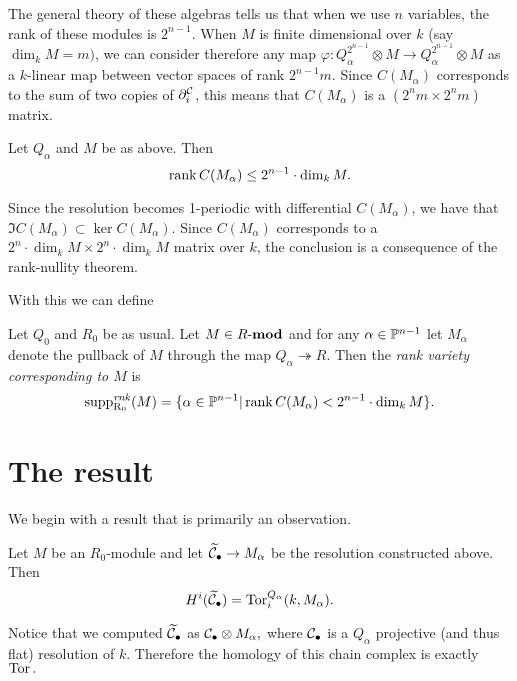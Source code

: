 \documentclass [11pt, proquest] {uwthesis}[2020/02/24]
\DeclareMathOperator{\supprRnaught}{supp^\mathit{rnk}_{R_0}}
\begin{document}
    The general theory of these algebras tells us that when we use $n$ variables, the rank of these modules is $2^{n-1}$. When $M$ is finite dimensional over $k$ (say $\dim_k M=m)$, we can consider therefore any map $\varphi:Q_\alpha^{2^{n-1}}\otimes M\to Q_\alpha^{2^{n-1}}\otimes M$ as a $k$-linear map between vector spaces of rank $2^{n-1}m.$ Since $C(M_\alpha)$ corresponds to the sum of two copies of $\partial^{\mathcal{C}}_i$, this means that $C(M_\alpha)$ is a $(2^nm\times 2^nm)$ matrix.
    
    \begin{prop}
        Let $Q_\alpha$ and $M$ be as above. Then
        \[\operatorname{rank} C(M_\alpha)\le 2^{n-1}\cdot\dim_k M.\]
    \end{prop}
    \begin{prf}
        Since the resolution becomes 1-periodic with differential $C(M_\alpha)$, we have that $\Im C(M_\alpha)\subset \ker C(M_\alpha).$ Since $C(M_\alpha)$ corresponds to a $2^n\cdot\dim_k M\times 2^n\cdot\dim_k M$ matrix over $k$, the conclusion is a consequence of the rank-nullity theorem.
    \end{prf}
    
    With this we can define
    \begin{defn}
        Let $Q_0$ and $R_0$ be as usual. Let $M\in R\text{-}\mathbf{mod}$ and for any $\alpha\in\mathbb{P}^{n-1}$ let $M_\alpha$ denote the pullback of $M$ through the map $Q_\alpha\twoheadrightarrow R$. Then the \emph{rank variety corresponding to $M$} is
        \[\supprRnaught(M)=\{\alpha\in\bbP^{n-1}|\rank C(M_\alpha) < 2^{n-1}\cdot\dim_k M\}.\]
    \end{defn}
    
    \section{The result}
    We begin with a result that is primarily an observation.
    \begin{lem}\label{lem:tor}
        Let $M$ be an $R_0$-module and let $\widetilde{\mathcal{C}}_\bullet\to M_\alpha$ be the resolution constructed above. Then
        \[H^i(\widetilde{\mathcal{C}}_\bullet)=\operatorname{Tor}_i^{Q_\alpha}(k,M_\alpha).\]
    \end{lem}
    \begin{prf}
        Notice that we computed $\widetilde{\mathcal{C}}_\bullet$ as $\mathcal{C}_\bullet\otimes M_\alpha,$ where $\mathcal{C}_\bullet$ is a $Q_\alpha$ projective (and thus flat) resolution of $k$. Therefore the homology of this chain complex is exactly $\operatorname{Tor}.$
    \end{prf}
    
\end{document}
